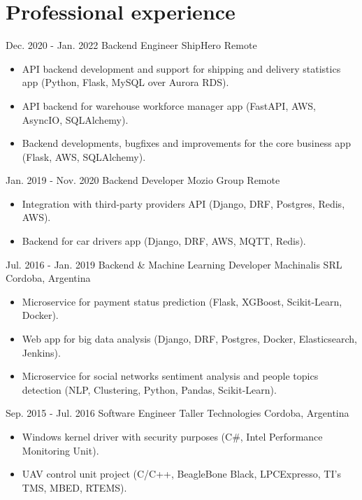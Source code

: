 
\section{Professional experience}
  \cventry
    {Dec. 2020 - Jan. 2022} %
    {Backend Engineer} %
    {ShipHero} %
    {Remote} %
    {}
    {
      \begin{itemize} %
        \item {API backend development and support for shipping and delivery statistics app (Python, Flask, MySQL over Aurora RDS).}
        \item {API backend for warehouse workforce manager app (FastAPI, AWS, AsyncIO, SQLAlchemy).}
        \item {Backend developments, bugfixes and improvements for the core business app (Flask, AWS, SQLAlchemy).}
      \end{itemize}
    }
  \cventry
    {Jan. 2019 - Nov. 2020} %
    {Backend Developer} %
    {Mozio Group} %
    {Remote} %
    {}
    {
      \begin{itemize} %
        \item {Integration with third-party providers API (Django, DRF, Postgres, Redis, AWS).}
        \item {Backend for car drivers app (Django, DRF, AWS, MQTT, Redis).}
      \end{itemize}
    }

  \cventry
    {Jul. 2016 - Jan. 2019} %
    {Backend \& Machine Learning Developer} %
    {Machinalis SRL} %
    {Cordoba, Argentina} %
    {}
    {
      \begin{itemize} %
        \item {Microservice for payment status prediction (Flask, XGBoost, Scikit-Learn, Docker).}
        \item {Web app for big data analysis (Django, DRF, Postgres, Docker, Elasticsearch, Jenkins).}
        \item {Microservice for social networks sentiment analysis and people topics detection (NLP, Clustering, Python, Pandas, Scikit-Learn).}
      \end{itemize}
    }

  \cventry
    {Sep. 2015 - Jul. 2016} %
    {Software Engineer} %
    {Taller Technologies} %
    {Cordoba, Argentina} %
    {}
    {
      \begin{itemize} %
        \item {Windows kernel driver with security purposes (C\#, Intel Performance Monitoring Unit).}
        \item {UAV control unit project (C/C++, BeagleBone Black, LPCExpresso, TI's TMS, MBED, RTEMS).}
      \end{itemize}
    }

